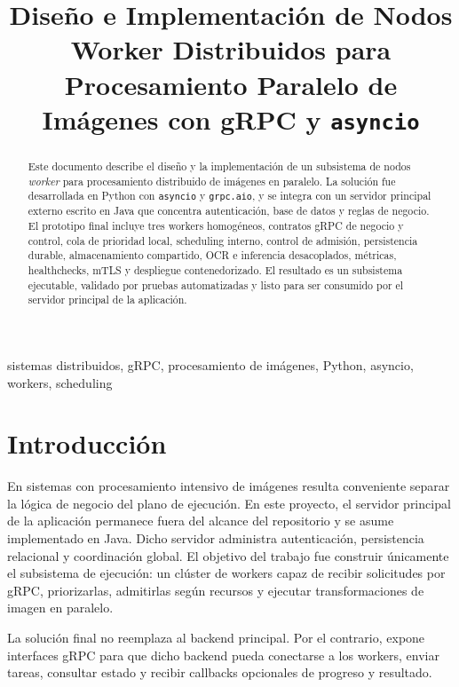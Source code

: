 \documentclass[conference]{IEEEtran}
\title{Diseño e Implementación de Nodos Worker Distribuidos para Procesamiento Paralelo de Imágenes con gRPC y \texttt{asyncio}}
\author{
\IEEEauthorblockN{Santos Enmanuel Manosalva Aceros}
\IEEEauthorblockA{
\textit{Universidad Pontificia Bolivariana}\\
Bucaramanga, Colombia
}
\and
\IEEEauthorblockN{Christian Mauricio Rodriguez Curubo}
\IEEEauthorblockA{
\textit{Universidad Pontificia Bolivariana}\\
Bucaramanga, Colombia
}
}
\begin{document}
\maketitle

\begin{abstract}
Este documento describe el diseño y la implementación de un subsistema de nodos \emph{worker} para procesamiento distribuido de imágenes en paralelo. La solución fue desarrollada en Python con \texttt{asyncio} y \texttt{grpc.aio}, y se integra con un servidor principal externo escrito en Java que concentra autenticación, base de datos y reglas de negocio. El prototipo final incluye tres workers homogéneos, contratos gRPC de negocio y control, cola de prioridad local, scheduling interno, control de admisión, persistencia durable, almacenamiento compartido, OCR e inferencia desacoplados, métricas, healthchecks, mTLS y despliegue contenedorizado. El resultado es un subsistema ejecutable, validado por pruebas automatizadas y listo para ser consumido por el servidor principal de la aplicación.
\end{abstract}

\begin{IEEEkeywords}
sistemas distribuidos, gRPC, procesamiento de imágenes, Python, asyncio, workers, scheduling
\end{IEEEkeywords}

\section{Introducción}
En sistemas con procesamiento intensivo de imágenes resulta conveniente separar la lógica de negocio del plano de ejecución. En este proyecto, el servidor principal de la aplicación permanece fuera del alcance del repositorio y se asume implementado en Java. Dicho servidor administra autenticación, persistencia relacional y coordinación global. El objetivo del trabajo fue construir únicamente el subsistema de ejecución: un clúster de workers capaz de recibir solicitudes por gRPC, priorizarlas, admitirlas según recursos y ejecutar transformaciones de imagen en paralelo.

La solución final no reemplaza al backend principal. Por el contrario, expone interfaces gRPC para que dicho backend pueda conectarse a los workers, enviar tareas, consultar estado y recibir callbacks opcionales de progreso y resultado.
\end{document}
